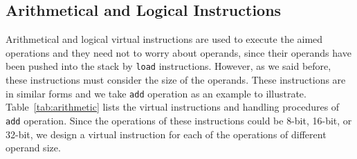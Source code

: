 \begin{table}[!t]
\renewcommand{\arraystretch}{1.0}
\begin{tabnote}
\end{tabnote}
\end{table}


\subsection{Arithmetical and Logical Instructions}
Arithmetical and logical virtual instructions are used to execute the aimed operations and they need not to worry about operands, since their operands have been pushed into the stack by \texttt{load} instructions. However, as we said before, these instructions must consider the size of the operands. These instructions are in similar forms and we take \texttt{add} operation as an example to illustrate. Table~\ref{tab:arithmetic} lists the virtual instructions and handling procedures of \texttt{add} operation. Since the operations of these instructions could be 8-bit, 16-bit, or 32-bit, we design a virtual instruction for each of the operations of different operand size.




